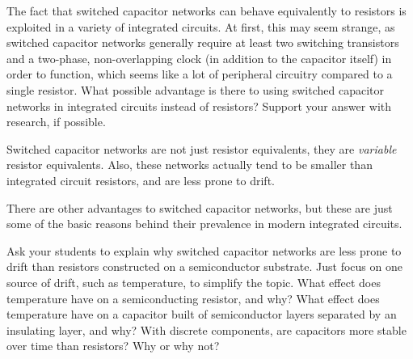 

The fact that switched capacitor networks can behave equivalently to resistors is exploited in a variety of integrated circuits.  At first, this may seem strange, as switched capacitor networks generally require at least two switching transistors and a two-phase, non-overlapping clock (in addition to the capacitor itself) in order to function, which seems like a lot of peripheral circuitry compared to a single resistor.  What possible advantage is there to using switched capacitor networks in integrated circuits instead of resistors?  Support your answer with research, if possible.







Switched capacitor networks are not just resistor equivalents, they are {\it variable} resistor equivalents.  Also, these networks actually tend to be smaller than integrated circuit resistors, and are less prone to drift.

There are other advantages to switched capacitor networks, but these are just some of the basic reasons behind their prevalence in modern integrated circuits.







Ask your students to explain why switched capacitor networks are less prone to drift than resistors constructed on a semiconductor substrate.  Just focus on one source of drift, such as temperature, to simplify the topic.  What effect does temperature have on a semiconducting resistor, and why?  What effect does temperature have on a capacitor built of semiconductor layers separated by an insulating layer, and why?  With discrete components, are capacitors more stable over time than resistors?  Why or why not?




